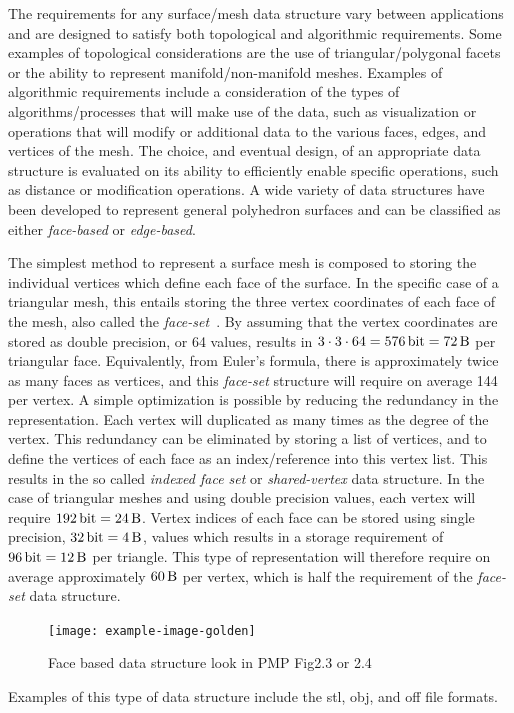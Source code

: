 The requirements for any surface/mesh data structure vary between applications and are designed to satisfy both topological and algorithmic requirements.
Some examples of topological considerations are the use of triangular/polygonal facets or the ability to represent manifold/non-manifold meshes.
Examples of algorithmic requirements include a consideration of the types of algorithms/processes that will make use of the data, such as visualization or operations that will modify or additional data to the various faces, edges, and vertices of the mesh.
The choice, and eventual design, of an appropriate data structure is evaluated on its ability to efficiently enable specific operations, such as distance or modification operations.
A wide variety of data structures have been developed to represent general polyhedron surfaces and can be classified as either \textit{face-based} or \textit{edge-based}.

The simplest method to represent a surface mesh is composed to storing the individual vertices which define each face of the surface.
In the specific case of a triangular mesh, this entails storing the three vertex coordinates of each face of the mesh, also called the \textit{face-set}~\cite{botsch2010}.
By assuming that the vertex coordinates are stored as double precision, or \SI{64}{\bit} values, results in \( 3 \cdot 3 \cdot 64 = \SI{576}{\bit} = \SI{72}{\byte}\) per triangular face.
Equivalently, from Euler's formula, there is approximately twice as many faces as vertices, and this \textit{face-set} structure will require on average \SI{144}{\byte} per vertex.
A simple optimization is possible by reducing the redundancy in the representation.
Each vertex will duplicated as many times as the degree of the vertex.
This redundancy can be eliminated by storing a list of vertices, and to define the vertices of each face as an index/reference into this vertex list.
This results in the so called \textit{indexed face set} or \textit{shared-vertex} data structure.
In the case of triangular meshes and using double precision values, each vertex will require \(\SI{192}{\bit} = \SI{24}{\byte}\).
Vertex indices of each face can be stored using single precision, \( \SI{32}{\bit} = \SI{4}{\byte}\), values which results in a storage requirement of \( \SI{96}{\bit} = \SI{12}{\byte}\) per triangle.
This type of representation will therefore require on average approximately \( \SI{60}{\byte} \) per vertex, which is half the requirement of the \textit{face-set} data structure.
\begin{figure}
    \centering
    \texttt{[image: example-image-golden]}
    \caption{Face based data structure look in PMP Fig2.3 or 2.4~\label{fig:face_based_data_structure}}
\end{figure}
Examples of this type of data structure include the \gls{stl}, \gls{obj}, and \gls{off} file formats.

